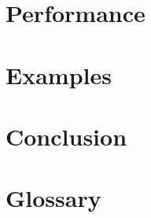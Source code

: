 \documentclass[12pt]{article}
\begin{document}
\section{Performance}





\section{Examples}







\section{Conclusion}





\section{Glossary}
\end{document}
